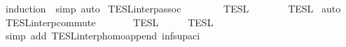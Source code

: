 \begin{isabellebody}
%
\isadelimproof
%
\endisadelimproof
%
\isatagproof
{}\isamarkupfalse%
\ {\isacharparenleft}induction\ {\isasymPhi}\ simp{\isacharcomma}\ auto{\isacharparenright}%
\endisatagproof
{\isafoldproof}%
%
\isadelimproof
%
\endisadelimproof
%
\isadelimdocument
%
\endisadelimdocument
%
\isatagdocument
%
\isamarkuptrue%
%
\endisatagdocument
{\isafolddocument}%
%
\isadelimdocument
%
\endisadelimdocument
{}\isamarkupfalse%
\ TESL{\isacharunderscore}interp{\isacharunderscore}assoc{\isacharcolon}\isanewline
\ \ {\isacartoucheopen}{\isasymlbrakk}{\isasymlbrakk}\ {\isacharparenleft}{\isasymPhi}\ {\isacharat}\ {\isasymPhi}\ {\isacharat}\ {\isasymPhi}\ {\isasymrbrakk}{\isasymrbrakk}\isactrlsub T\isactrlsub E\isactrlsub S\isactrlsub L\ {\isacharequal}\ {\isasymlbrakk}{\isasymlbrakk}\ {\isasymPhi}\ {\isacharat}\ {\isacharparenleft}{\isasymPhi}\ {\isacharat}\ {\isasymPhi}\ {\isasymrbrakk}{\isasymrbrakk}\isactrlsub T\isactrlsub E\isactrlsub S\isactrlsub L{\isacartoucheclose}\isanewline
%
\isadelimproof
%
\endisadelimproof
%
\isatagproof
{}\isamarkupfalse%
\ auto%
\endisatagproof
{\isafoldproof}%
%
\isadelimproof
\isanewline
%
\endisadelimproof
\isanewline
{}\isamarkupfalse%
\ TESL{\isacharunderscore}interp{\isacharunderscore}commute{\isacharcolon}\isanewline
\ \ \ {\isacartoucheopen}{\isasymlbrakk}{\isasymlbrakk}\ {\isasymPhi}\ {\isacharat}\ {\isasymPhi}\ {\isasymrbrakk}{\isasymrbrakk}\isactrlsub T\isactrlsub E\isactrlsub S\isactrlsub L\ {\isacharequal}\ {\isasymlbrakk}{\isasymlbrakk}\ {\isasymPhi}\ {\isacharat}\ {\isasymPhi}\ {\isasymrbrakk}{\isasymrbrakk}\isactrlsub T\isactrlsub E\isactrlsub S\isactrlsub L{\isacartoucheclose}\isanewline
%
\isadelimproof
%
\endisadelimproof
%
\isatagproof
{}\isamarkupfalse%
\ {\isacharparenleft}simp\ add{\isacharcolon}\ TESL{\isacharunderscore}interp{\isacharunderscore}homo{\isacharunderscore}append\ inf{\isacharunderscore}sup{\isacharunderscore}aci{\isacharparenleft}{}{\isacharparenright}{\isacharparenright}%
\endisatagproof
{\isafoldproof}%
%
\isadelimproof
\isanewline
%
\endisadelimproof
\isanewline
{}\isamarkupfalse%

\end{isabellebody}

